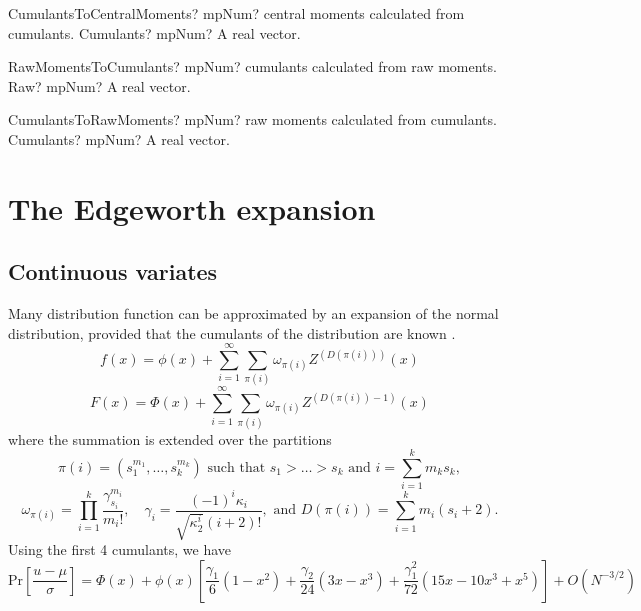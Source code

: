 \vspace{0.6cm}

\begin{mpFunctionsExtract}
	\mpFunctionOneNotImplemented
	{CumulantsToCentralMoments? mpNum? central moments calculated from cumulants.}
	{Cumulants? mpNum? A real vector.}
\end{mpFunctionsExtract}


\vspace{0.6cm}

\begin{mpFunctionsExtract}
	\mpFunctionOneNotImplemented
	{RawMomentsToCumulants? mpNum? cumulants calculated from raw moments.}
	{Raw? mpNum? A real vector.}	
\end{mpFunctionsExtract}


\vspace{0.6cm}

\begin{mpFunctionsExtract}
	\mpFunctionOneNotImplemented
	{CumulantsToRawMoments? mpNum? raw moments calculated from cumulants.}
	{Cumulants? mpNum? A real vector.}
\end{mpFunctionsExtract}





\newpage
\section{The Edgeworth expansion}

\subsection{Continuous variates}

Many distribution function can be approximated by an expansion of the normal distribution, provided that the cumulants of the distribution are known \citep{Lee_1992}.
\begin{equation}
	f(x) = \phi(x) + \sum_{i=1}^{\infty} \sum_{\pi(i)} \omega_{\pi(i)} Z^{(D(\pi(i)))}(x)
\end{equation}
\begin{equation}
	F(x) = \Phi(x) + \sum_{i=1}^{\infty} \sum_{\pi(i)} \omega_{\pi(i)} Z^{(D(\pi(i))-1)}(x)
\end{equation}
where the summation is extended over the partitions
\begin{equation}
	\pi(i) = \left(s_1^{m_1},\ldots,s_k^{m_k}\right) \text{ such that } s_1 > \ldots > s_k \text{ and } i = \sum_{i=1}^k{m_k s_k},
\end{equation}
\begin{equation}
	\omega_{\pi(i)} = \prod_{i=1}^k \frac{\gamma_{s_i}^{m_i}}{m_i !}, \quad \gamma_i = \frac{(-1)^i \kappa_i}{\sqrt{\kappa_2^i}(i+2)!}, \text{ and } D(\pi(i)) = \sum_{i=1}^k m_i (s_i +2).
\end{equation}
Using the first 4 cumulants, we have
\begin{equation}
	\text{Pr}\left[\frac{u-\mu}{\sigma}\right] = \Phi(x) + \phi(x)\left[\frac{\gamma_1}{6}(1-x^2) + \frac{\gamma_2}{24}(3x-x^3) +  \frac{\gamma_1^2}{72}(15x-10x^3+x^5)\right] + O(N^{-3/2}) 
\end{equation}


